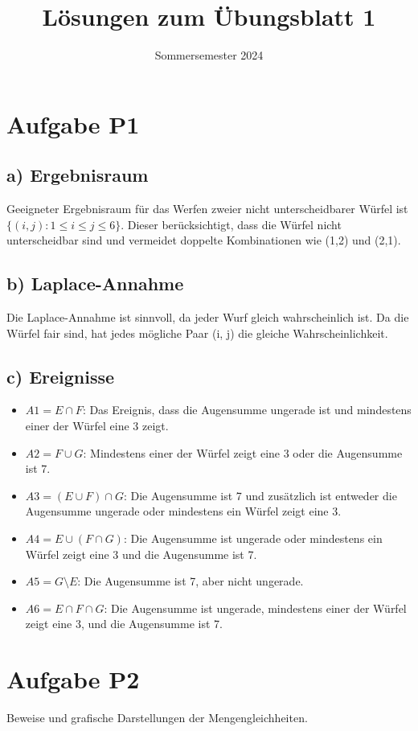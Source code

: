 \documentclass{article}
\title{Lösungen zum Übungsblatt 1}
\author{}
\date{Sommersemester 2024}
\begin{document}
\maketitle

\section*{Aufgabe P1}
\subsection*{a) Ergebnisraum}
Geeigneter Ergebnisraum für das Werfen zweier nicht unterscheidbarer Würfel ist $\{ (i, j) : 1 \leq i \leq j \leq 6 \}$. Dieser berücksichtigt, dass die Würfel nicht unterscheidbar sind und vermeidet doppelte Kombinationen wie (1,2) und (2,1).

\subsection*{b) Laplace-Annahme}
Die Laplace-Annahme ist sinnvoll, da jeder Wurf gleich wahrscheinlich ist. Da die Würfel fair sind, hat jedes mögliche Paar (i, j) die gleiche Wahrscheinlichkeit.

\subsection*{c) Ereignisse}
\begin{itemize}
    \item $A1 = E \cap F$: Das Ereignis, dass die Augensumme ungerade ist und mindestens einer der Würfel eine 3 zeigt.
    \item $A2 = F \cup G$: Mindestens einer der Würfel zeigt eine 3 oder die Augensumme ist 7.
    \item $A3 = (E \cup F) \cap G$: Die Augensumme ist 7 und zusätzlich ist entweder die Augensumme ungerade oder mindestens ein Würfel zeigt eine 3.
    \item $A4 = E \cup (F \cap G)$: Die Augensumme ist ungerade oder mindestens ein Würfel zeigt eine 3 und die Augensumme ist 7.
    \item $A5 = G \setminus E$: Die Augensumme ist 7, aber nicht ungerade.
    \item $A6 = E \cap F \cap G$: Die Augensumme ist ungerade, mindestens einer der Würfel zeigt eine 3, und die Augensumme ist 7.
\end{itemize}

\section*{Aufgabe P2}
Beweise und grafische Darstellungen der Mengengleichheiten.
\end{document}
